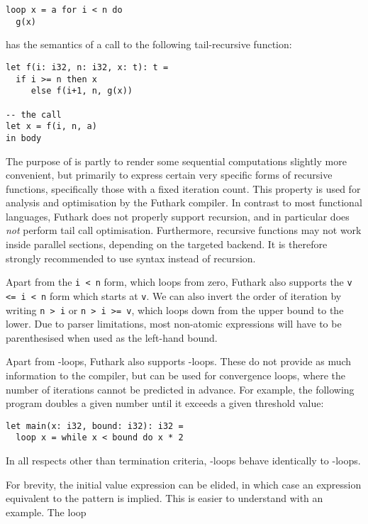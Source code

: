 \documentclass[oneside,11pt]{book}
\begin{document}
\begin{lstlisting}
loop x = a for i < n do
  g(x)
\end{lstlisting}

\noindent
has the semantics of a call to the following tail-recursive function:

\begin{lstlisting}
let f(i: i32, n: i32, x: t): t =
  if i >= n then x
     else f(i+1, n, g(x))

-- the call
let x = f(i, n, a)
in body
\end{lstlisting}

The purpose of  is partly to render some sequential
computations slightly more convenient, but primarily to express
certain very specific forms of recursive functions, specifically those
with a fixed iteration count.  This property is used for analysis and
optimisation by the Futhark compiler.  In contrast to most functional
languages, Futhark does not properly support recursion, and in
particular does \textit{not} perform tail call optimisation.
Furthermore, recursive functions may not work inside parallel
sections, depending on the targeted backend.  It is therefore strongly
recommended to use  syntax instead of recursion.

Apart from the \texttt{i < n} form, which loops from zero, Futhark
also supports the \texttt{v <= i < n} form which starts at \texttt{v}.
We can also invert the order of iteration by writing \texttt{n > i} or
\texttt{n > i >= v}, which loops down from the upper bound to the
lower.  Due to parser limitations, most non-atomic expressions will
have to be parenthesised when used as the left-hand bound.

Apart from -loops, Futhark also supports -loops.
These do not provide as much information to the compiler, but can be
used for convergence loops, where the number of iterations cannot be
predicted in advance.  For example, the following program doubles a
given number until it exceeds a given threshold value:

\begin{lstlisting}
let main(x: i32, bound: i32): i32 =
  loop x = while x < bound do x * 2
\end{lstlisting}

\noindent
In all respects other than termination criteria, -loops
behave identically to -loops.

For brevity, the initial value expression can be elided, in which case
an expression equivalent to the pattern is implied.  This is easier to
understand with an example.  The loop
\end{document}
